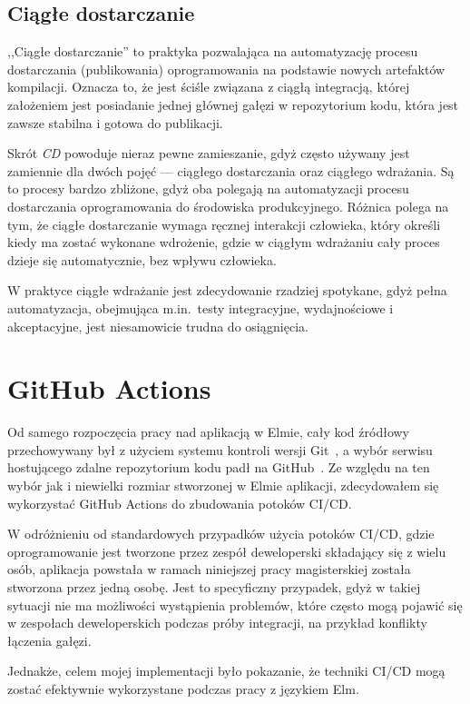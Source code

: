 \documentclass[twoside,a4paper]{report}
\begin{document}
\subsection{Ciągłe dostarczanie}
,,Ciągłe dostarczanie'' to praktyka pozwalająca na automatyzację procesu dostarczania (publikowania) oprogramowania na podstawie nowych artefaktów kompilacji.
Oznacza to, że jest ściśle związana z ciągłą integracją, której założeniem jest posiadanie jednej głównej gałęzi w repozytorium kodu, która jest zawsze stabilna i gotowa do publikacji.

Skrót \textit{CD} powoduje nieraz pewne zamieszanie, gdyż często używany jest zamiennie dla dwóch pojęć --- ciągłego dostarczania oraz ciągłego wdrażania.
Są to procesy bardzo zbliżone, gdyż oba polegają na automatyzacji procesu dostarczania oprogramowania do środowiska produkcyjnego.
Różnica polega na tym, że ciągłe dostarczanie wymaga ręcznej interakcji człowieka, który określi kiedy ma zostać wykonane wdrożenie, gdzie w ciągłym wdrażaniu cały proces dzieje się automatycznie, bez wpływu człowieka.

W praktyce ciągłe wdrażanie jest zdecydowanie rzadziej spotykane, gdyż pełna automatyzacja, obejmująca m.in.~testy integracyjne, wydajnościowe i akceptacyjne, jest niesamowicie trudna do osiągnięcia.

\section{GitHub Actions}
Od samego rozpoczęcia pracy nad aplikacją w Elmie, cały kod źródłowy przechowywany był z użyciem systemu kontroli wersji Git~\cite{git}, a wybór serwisu hostującego zdalne repozytorium kodu padł na GitHub~\cite{github}.
Ze względu na ten wybór jak i niewielki rozmiar stworzonej w Elmie aplikacji, zdecydowałem się wykorzystać GitHub Actions do zbudowania potoków CI/CD\@.

W odróżnieniu od standardowych przypadków użycia potoków CI/CD, gdzie oprogramowanie jest tworzone przez zespół deweloperski składający się z wielu osób, aplikacja powstała w ramach niniejszej pracy magisterskiej została stworzona przez jedną osobę.
Jest to specyficzny przypadek, gdyż w takiej sytuacji nie ma możliwości wystąpienia problemów, które często mogą pojawić się w zespołach deweloperskich podczas próby integracji, na przykład konflikty łączenia gałęzi.

Jednakże, celem mojej implementacji było pokazanie, że techniki CI/CD mogą zostać efektywnie wykorzystane podczas pracy z językiem Elm.
\end{document}
